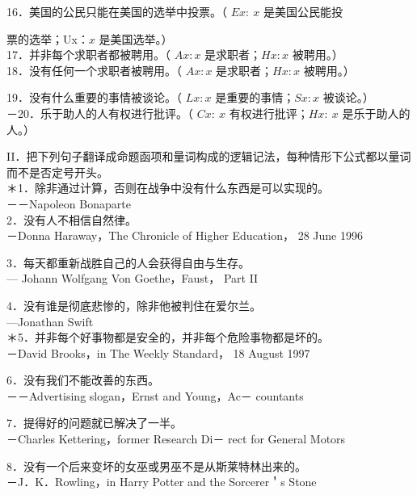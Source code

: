 16．美国的公民只能在美国的选举中投票。（ $E x: ~ x$ 是美国公民能投

票的选举；Ux：$x$ 是美国选举。）\\
17．并非每个求职者都被聘用。（ $A x: x$ 是求职者；$H x: x$ 被聘用。）\\
18．没有任何一个求职者被聘用。（ $A x: x$ 是求职者；$H x: x$ 被聘用。）

19．没有什么重要的事情被谈论。（ $L x: x$ 是重要的事情；$S x: x$ 被谈论。）\\
－20．乐于助人的人有权进行批评。（ $C x: ~ x$ 有权进行批评；$H x: ~ x$ 是乐于助人的人。）

II．把下列句子翻译成命题函项和量词构成的逻辑记法，每种情形下公式都以量词而不是否定号开头。\\
＊1．除非通过计算，否则在战争中没有什么东西是可以实现的。\\
－－Napoleon Bonaparte\\
2．没有人不相信自然律。\\
－Donna Haraway，The Chronicle of Higher Education， 28 June 1996

3．每天都重新战胜自己的人会获得自由与生存。\\
— Johann Wolfgang Von Goethe，Faust， Part II

4．没有谁是彻底悲惨的，除非他被判住在爱尔兰。\\
—Jonathan Swift\\
＊5．并非每个好事物都是安全的，并非每个危险事物都是坏的。\\
－David Brooks，in The Weekly Standard， 18 August 1997

6．没有我们不能改善的东西。\\
－－Advertising slogan，Ernst and Young，Ac－ countants

7．提得好的问题就已解决了一半。\\
－Charles Kettering，former Research Di－ rect for General Motors

8．没有一个后来变坏的女巫或男巫不是从斯莱特林出来的。\\
－J．K．Rowling，in Harry Potter and the Sorcerer＇s Stone


